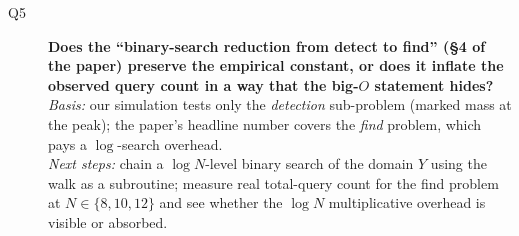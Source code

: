 \begin{description}
\item[Q5] \textbf{Does the ``binary-search reduction from detect to find'' (\S4 of the paper) preserve the empirical constant, or does it inflate the observed query count in a way that the big-$O$ statement hides?}\\
\emph{Basis:} our simulation tests only the \emph{detection} sub-problem (marked mass at the peak); the paper's headline number covers the \emph{find} problem, which pays a $\log$-search overhead.\\
\emph{Next steps:} chain a $\log N$-level binary search of the domain $Y$ using the walk as a subroutine; measure real total-query count for the find problem at $N\in\{8,10,12\}$ and see whether the $\log N$ multiplicative overhead is visible or absorbed.
\end{description}
